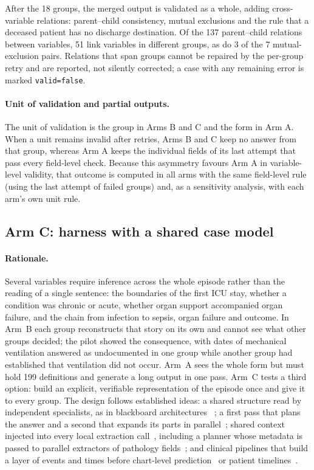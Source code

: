 After the 18 groups, the merged output is validated as a whole, adding cross-variable relations:
parent--child consistency, mutual exclusions and the rule that a deceased patient has no discharge
destination. Of the 137 parent--child relations between variables, 51 link variables in different groups,
as do 3 of the 7 mutual-exclusion pairs. Relations that span groups cannot be repaired by the per-group
retry and are reported, not silently corrected; a case with any remaining error is marked
\texttt{valid=false}.

\paragraph{Unit of validation and partial outputs.} The unit of validation is the group in Arms B and C
and the form in Arm A. When a unit remains invalid after retries, Arms B and C keep no answer from that
group, whereas Arm A keeps the individual fields of its last attempt that pass every field-level check.
Because this asymmetry favours Arm A in variable-level validity, that outcome is computed in all arms with
the same field-level rule (using the last attempt of failed groups) and, as a sensitivity analysis, with
each arm's own unit rule.

\subsection{Arm C: harness with a shared case model}\label{sec:armc}

\paragraph{Rationale.} Several variables require inference across the whole episode rather than the reading
of a single sentence: the boundaries of the first ICU stay, whether a condition was chronic or acute,
whether organ support accompanied organ failure, and the chain from infection to sepsis, organ failure and
outcome. In Arm~B each group reconstructs that story on its own and cannot see what other groups decided;
the pilot showed the consequence, with dates of mechanical ventilation answered as undocumented in one group
while another group had established that ventilation did not occur. Arm~A sees the whole form but must hold
199 definitions and generate a long output in one pass. Arm~C tests a third option: build an explicit,
verifiable representation of the episode once and give it to every group. The design follows established
ideas: a shared structure read by independent specialists, as in blackboard architectures%
~\cite{erman1980hearsay,nii1986blackboard,blackboardmas2025}; a first pass that plans the answer and a second
that expands its parts in parallel~\cite{skeletonofthought2024}; shared context injected into every local
extraction call~\cite{hisccg2026}, including a planner whose metadata is passed to parallel extractors of
pathology fields~\cite{promptplanextract2026}; and clinical pipelines that build a layer of events and times
before chart-level prediction~\cite{psych2stage2026} or patient timelines~\cite{clinicirca2026}.

